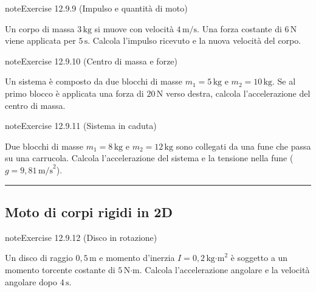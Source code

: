 \documentclass[letterpaper,10pt,italian]{jupyterBook}
\begin{document}
\begin{sphinxadmonition}{note}{Exercise 12.9.9 (Impulso e quantità di moto)}



\sphinxAtStartPar
Un corpo di massa \(3 \, \text{kg}\) si muove con velocità \(4 \, \text{m/s}\). Una forza costante di \(6 \, \text{N}\) viene applicata per \(5 \, \text{s}\). Calcola l’impulso ricevuto e la nuova velocità del corpo.
\end{sphinxadmonition}
 \label{exercise:ch/mechanics/dynamics-problems-exercise-9}

\begin{sphinxadmonition}{note}{Exercise 12.9.10 (Centro di massa e forze)}



\sphinxAtStartPar
Un sistema è composto da due blocchi di masse \(m_1 = 5 \, \text{kg}\) e \(m_2 = 10 \, \text{kg}\). Se al primo blocco è applicata una forza di \(20 \, \text{N}\) verso destra, calcola l’accelerazione del centro di massa.
\end{sphinxadmonition}
 \label{exercise:ch/mechanics/dynamics-problems-exercise-10}

\begin{sphinxadmonition}{note}{Exercise 12.9.11 (Sistema in caduta)}



\sphinxAtStartPar
Due blocchi di masse \(m_1 = 8 \, \text{kg}\) e \(m_2 = 12 \, \text{kg}\) sono collegati da una fune che passa su una carrucola. Calcola l’accelerazione del sistema e la tensione nella fune (\(g = 9,81 \, \text{m/s}^2\)).
\end{sphinxadmonition}


\bigskip\hrule\bigskip



\subsection{Moto di corpi rigidi in 2D}
\label{\detokenize{ch/mechanics/dynamics-problems:moto-di-corpi-rigidi-in-2d}} \label{exercise:ch/mechanics/dynamics-problems-exercise-11}

\begin{sphinxadmonition}{note}{Exercise 12.9.12 (Disco in rotazione)}



\sphinxAtStartPar
Un disco di raggio \(0,5 \, \text{m}\) e momento d’inerzia \(I = 0,2 \, \text{kg·m}^2\) è soggetto a un momento torcente costante di \(5 \, \text{N·m}\). Calcola l’accelerazione angolare e la velocità angolare dopo \(4 \, \text{s}\).
\end{sphinxadmonition}
 \label{exercise:ch/mechanics/dynamics-problems-exercise-12}
\end{document}
